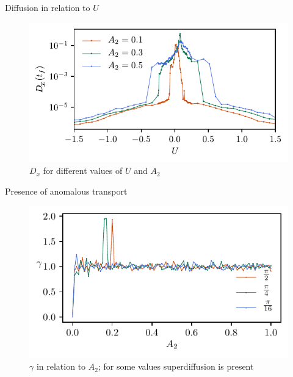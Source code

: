 \documentclass[10pt]{beamer}
\begin{document}
\begin{frame}{Diffusion in relation to $U$}


\begin{figure}[h]
\centering
\includegraphics[scale = 0.9]{graf_2ondas/U_Dx.pdf}
\caption{$D_x$ for different values of $U$ and $A_2$}
\label{U_2wave}
\end{figure}

\end{frame}


\begin{frame}{Presence of anomalous transport}

\begin{figure}
    \includegraphics{graf_2ondas/gamma.pdf}
    \caption{ $\gamma$ in relation to $A_2$; for some values superdiffusion is present}
\end{figure}

\end{frame}
\end{document}
